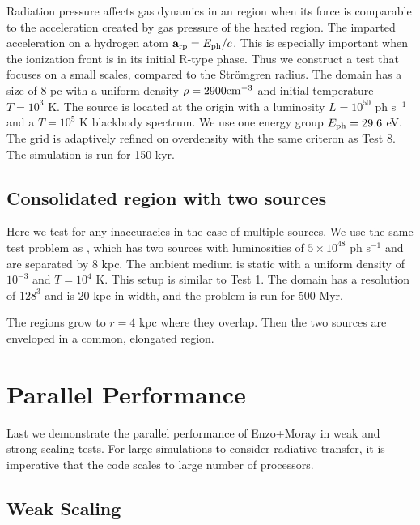 \documentclass[12pt,preprint]{aastex}
\begin{document}
Radiation pressure affects gas dynamics in an  region when
its force is comparable to the acceleration created by gas pressure of
the heated region.  The imparted acceleration on a hydrogen atom
$\mathbf{a}_{\rm rp} = E_{\rm ph}/c$.  This is especially important
when the ionization front is in its initial R-type phase.  Thus we
construct a test that focuses on a small scales, compared to the
Str\"{o}mgren radius.  The domain has a size of 8 pc with a uniform
density $\rho = 2900 \cubecm$ and initial temperature $T = 10^3$ K.
The source is located at the origin with a luminosity $L = 10^{50}$ ph
s$^{-1}$ and a $T=10^5$ K blackbody spectrum.  We use one energy group
$E_{\rm ph} = 29.6$ eV.  The grid is adaptively refined on overdensity
with the same criteron as Test 8.  The simulation is run for 150 kyr.

\subsection{Consolidated  region with two sources}

Here we test for any inaccuracies in the case of multiple sources.  We
use the same test problem as \citet[][\S5.1.2]{Petkova09}, which has
two sources with luminosities of $5 \times 10^{48}$ ph s$^{-1}$ and
are separated by 8 kpc.  The ambient medium is static with a uniform
density of $10^{-3}$ \cubecm and $T = 10^4$ K.  This setup is similar
to Test 1.  The domain has a resolution of $128^3$ and is 20 kpc in
width, and the problem is run for 500 Myr.  

The  regions grow to $r = 4$ kpc where they overlap.  Then
the two sources are enveloped in a common, elongated 
region.

\section{Parallel Performance}

Last we demonstrate the parallel performance of Enzo+Moray in weak and
strong scaling tests.  For large simulations to consider radiative
transfer, it is imperative that the code scales to large number of
processors.

\subsection{Weak Scaling}
\label{sec:weak_sc}
\end{document}
